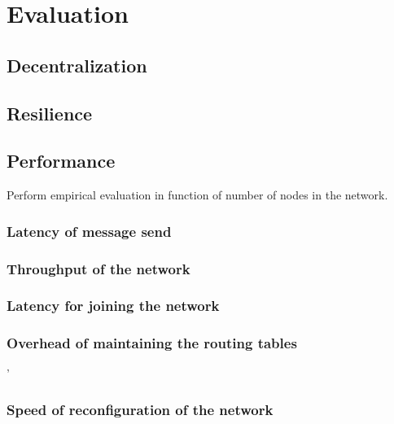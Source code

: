 \chapter{Evaluation}

\section{Decentralization}

\section{Resilience}

\section{Performance}

Perform empirical evaluation in function of number of nodes in the network.

\subsection{Latency of message send}

\subsection{Throughput of the network}

\subsection{Latency for joining the network}

\subsection{Overhead of maintaining the routing tables}

'\subsection{Speed of reconfiguration of the network}